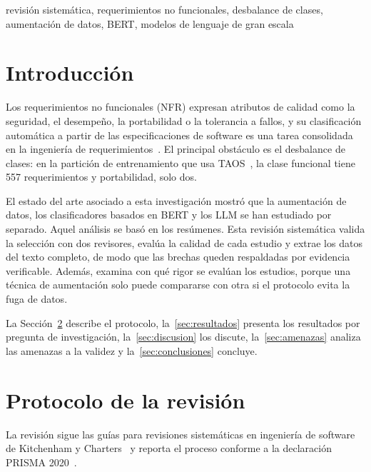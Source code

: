 \documentclass[conference]{IEEEtran}
\begin{document}
\begin{IEEEkeywords}
revisión sistemática, requerimientos no funcionales, desbalance de clases, aumentación de datos, BERT, modelos de lenguaje de gran escala
\end{IEEEkeywords}

\section{Introducción}
Los requerimientos no funcionales (NFR) expresan atributos de calidad como la seguridad, el desempeño, la portabilidad o la tolerancia a fallos, y su clasificación automática a partir de las especificaciones de software es una tarea consolidada en la ingeniería de requerimientos~\cite{ClelandHuang2007-NFR,Kurtanovic2017-SupervisedML,Hey2020-NoRBERT}. El principal obstáculo es el desbalance de clases: en la partición de entrenamiento que usa TAOS~\cite{BenAmmar2025-TAOS}, la clase funcional tiene 557 requerimientos y portabilidad, solo dos.

El estado del arte asociado a esta investigación mostró que la aumentación de datos, los clasificadores basados en BERT y los LLM se han estudiado por separado. Aquel análisis se basó en los resúmenes. Esta revisión sistemática valida la selección con dos revisores, evalúa la calidad de cada estudio y extrae los datos del texto completo, de modo que las brechas queden respaldadas por evidencia verificable. Además, examina con qué rigor se evalúan los estudios, porque una técnica de aumentación solo puede compararse con otra si el protocolo evita la fuga de datos.

La Sección~\ref{sec:protocolo} describe el protocolo, la~\ref{sec:resultados} presenta los resultados por pregunta de investigación, la~\ref{sec:discusion} los discute, la~\ref{sec:amenazas} analiza las amenazas a la validez y la~\ref{sec:conclusiones} concluye.

\section{Protocolo de la revisión}\label{sec:protocolo}
La revisión sigue las guías para revisiones sistemáticas en ingeniería de software de Kitchenham y Charters~\cite{Kitchenham2007-Guidelines,Kitchenham2015-EBSE} y reporta el proceso conforme a la declaración PRISMA 2020~\cite{Page2021-PRISMA}.
\end{document}
